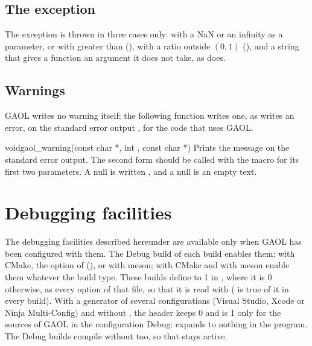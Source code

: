\subsection{The  exception}\label{sec:domain_error}

The exception  is thrown in three cases only:
 with a NaN or an infinity as a parameter, or with 
greater than  (),
 with a ratio outside $(0, 1)$ (), and a
string that gives a function an argument it does not take, as
 does.

\subsection{Warnings}\label{sec:warnings}
%

GAOL writes no warning itself; the following function writes one, as
 writes an error, on the standard error output
, for the code that uses GAOL.

\begin{deffun}{void}{gaol\_warning}{(const char *, int , const char *)}
Prints the message  on the standard error output. The second form
should be called with the macro  for its first two
parameters. A null  is written , and a null
 is an empty text.\newinvfive
\end{deffun}

\section{Debugging facilities}\label{sec:debugging-facilities}
%

The debugging facilities described hereunder are available only when GAOL
has been configured with them. The Debug build of each build enables them:
 with CMake, the option
 of  (), or
 with meson;  with CMake
and  with meson enable them whatever the build
type.\newinvfive{} These builds define  to 1 in
, where it is 0 otherwise, as every option
of that file, so that it is read with  ( is true of
it in every build). With a generator of several configurations (Visual Studio,
Xcode or Ninja Multi-Config) and without , the header
keeps 0 and  is 1 only for the sources of GAOL in the
configuration Debug:  expands to nothing in the
program. The Debug builds compile without  too, so
that  stays active.\newinvfive

